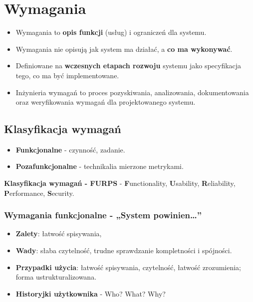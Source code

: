 \documentclass[a4paper]{article}
\begin{document}
    \section{Wymagania}
    \begin{itemize}
        \item Wymagania to \textbf{opis funkcji} (usług) i ograniczeń dla systemu.
        \item Wymagania nie opisują jak system ma działać, a \textbf{co ma
        wykonywać}.
        \item Definiowane na \textbf{wczesnych etapach rozwoju} systemu jako specyfikacja tego, co ma być
        implementowane.
        \item Inżynieria wymagań to proces pozyskiwania, analizowania, dokumentowania oraz weryfikowania
        wymagań dla projektowanego systemu.

    \end{itemize}

    \subsection{Klasyfikacja wymagań}
    \begin{itemize}
        \item \textbf{Funkcjonalne} - czynność, zadanie.
        \item \textbf{Pozafunkcjonalne} - technikalia mierzone metrykami.
    \end{itemize}

    \textbf{Klasyfikacja wymagań - FURPS} - \textbf{F}unctionality, \textbf{U}sability, \textbf{R}eliability,
    \textbf{P}erformance, \textbf{S}ecurity.

    \subsubsection{Wymagania funkcjonalne - „System powinien\dots”}
    \begin{itemize}
        \item \textbf{Zalety}: łatwość spisywania,
        \item \textbf{Wady}: słaba czytelność, trudne sprawdzanie kompletności i spójności.
        \item \textbf{Przypadki użycia}:  łatwość spisywania, czytelność, łatwość zrozumienia; forma ustrukturalizowana.
        \item \textbf{Historyjki użytkownika} - Who? What? Why?
    \end{itemize}
\end{document}
